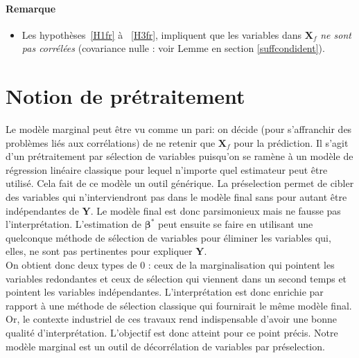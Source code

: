 \documentclass[12pt,a4paper]{report}
\begin{document}
		\paragraph{Remarque}
\begin{itemize}
\item Les hypothèses~\ref{H1fr}  à ~\ref{H3fr}, impliquent que les variables dans $\boldsymbol{X}_f$ {\it ne sont pas corrélées} (covariance nulle : voir Lemme en section \ref{suffcondident}).
\end{itemize} 
	\section{Notion de prétraitement}
	Le modèle marginal peut être vu comme un pari: on décide (pour s'affranchir des problèmes liés aux corrélations) de ne retenir que $\boldsymbol{X}_f$ pour la prédiction.
	Il s'agit d'un prétraitement par sélection de variables puisqu'on se ramène à un modèle de régression linéaire classique pour lequel n'importe quel estimateur peut être utilisé. Cela fait de ce modèle un outil générique. La préselection permet de cibler des variables qui n'interviendront pas dans le modèle final sans pour autant être indépendantes de $\boldsymbol{Y}$. Le modèle final est donc parsimonieux mais ne fausse pas l'interprétation. L'estimation de $\boldsymbol{\beta}^*$ peut ensuite se faire en utilisant une quelconque méthode de sélection de variables pour éliminer les variables qui, elles, ne sont pas pertinentes pour expliquer $\boldsymbol{Y}$.\\
	
	 On obtient donc deux types de 0 : ceux de la marginalisation qui pointent les variables redondantes et ceux de sélection qui viennent dans un second temps et pointent les variables indépendantes. L'interprétation est donc enrichie par rapport à une méthode de sélection classique qui fournirait le même modèle final. Or, le contexte industriel de ces travaux rend indispensable d'avoir une bonne qualité d'interprétation. L'objectif est donc atteint pour ce point précis. Notre modèle marginal est un outil de décorrélation de variables par préselection.
	 
\end{document}
